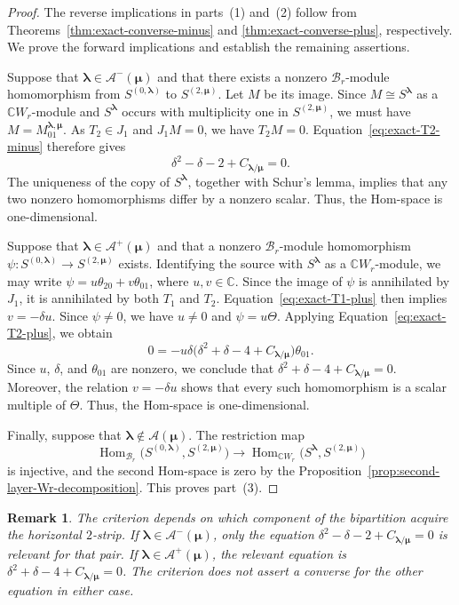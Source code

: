 \documentclass[10pt,a4paper]{amsart}
\newtheorem{remark}[theorem]{Remark}
\DeclareMathOperator {\Hom}{Hom}
\newcommand{\C}{\mathbb{C}}
\newcommand{\1}{\mathfrak{1}}
\newcommand{\B}{\mathcal{B}}
\begin{document}
\begin{proof}
The reverse implications in parts~(1) and~(2) follow
from Theorems~\ref{thm:exact-converse-minus} and
\ref{thm:exact-converse-plus}, respectively.
We prove the forward implications and establish the
remaining assertions.

Suppose that $\bm\lambda\in\mathcal A^-(\bm\mu)$
and that there exists a nonzero $\B_r$-module
homomorphism from $S^{(0,\bm\lambda)}$ to
$S^{(2,\bm\mu)}$.
Let $M$ be its image.
Since $M\cong S^{\bm\lambda}$ as a $\C W_r$-module
and $S^{\bm\lambda}$ occurs with multiplicity one
in $S^{(2,\bm\mu)}$, we must have
$M=M_{01}^{\bm\lambda,\bm\mu}$.
As $T_2\in J_1$ and $J_1M=0$, we have $T_2M=0$.
Equation~\eqref{eq:exact-T2-minus} therefore gives
$$
\delta^2-\delta-2+C_{\bm\lambda/\bm\mu}=0.
$$
The uniqueness of the copy of $S^{\bm\lambda}$,
together with Schur's lemma, implies that any two
nonzero homomorphisms differ by a nonzero scalar.
Thus, the Hom-space is one-dimensional.

Suppose that $\bm\lambda\in\mathcal A^+(\bm\mu)$
and that a nonzero $\B_r$-module homomorphism $\psi:S^{(0,\bm\lambda)}\longrightarrow S^{(2,\bm\mu)}$ exists. Identifying the source with $S^{\bm\lambda}$ as a
$\C W_r$-module, we may write
$\psi=u\theta_{20}+v\theta_{01}$, where $u,v\in\C$. Since the image of $\psi$ is annihilated by $J_1$,
it is annihilated by both $T_1$ and $T_2$. Equation~\eqref{eq:exact-T1-plus} then implies $v=-\delta u$.
Since $\psi\neq0$, we have $u\neq0$ and $\psi=u\Theta$. Applying Equation~\eqref{eq:exact-T2-plus}, we obtain
$$
0=-u\delta
\bigl(\delta^2+\delta-4+C_{\bm\lambda/\bm\mu}\bigr)
\theta_{01}.
$$
Since $u$, $\delta$, and $\theta_{01}$ are nonzero, we conclude that
$\delta^2+\delta-4+C_{\bm\lambda/\bm\mu}=0$. Moreover, the relation $v=-\delta u$ shows that every such homomorphism is a scalar multiple of $\Theta$. Thus, the Hom-space is one-dimensional.

Finally, suppose that
$\bm\lambda\notin\mathcal A(\bm\mu)$.
The restriction map
$$
\Hom_{\B_r}
\bigl(S^{(0,\bm\lambda)},S^{(2,\bm\mu)}\bigr)
\longrightarrow
\Hom_{\C W_r}
\bigl(S^{\bm\lambda},S^{(2,\bm\mu)}\bigr)
$$
is injective, and the second Hom-space is zero by the Proposition~\ref{prop:second-layer-Wr-decomposition}. This proves part~(3).
\end{proof}

\begin{remark}\label{rem:exact-matched-criterion}
The criterion depends on which component of the bipartition acquire the horizontal $2$-strip. If $\bm\lambda\in\mathcal A^-(\bm\mu)$, only the equation $\delta^2-\delta-2+C_{\bm\lambda/\bm\mu}=0$
is relevant for that pair. If $\bm\lambda\in\mathcal A^+(\bm\mu)$, the relevant equation is $\delta^2+\delta-4+C_{\bm\lambda/\bm\mu}=0$.
The criterion does not assert a converse for the other equation in either case.
\end{remark}
\end{document}
